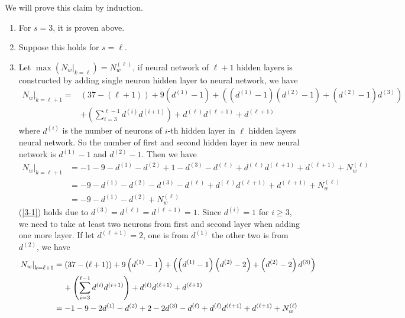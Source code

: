 \documentclass[12pt]{article}
\newcommand{\ParTh}[1]{\left(#1\right)}
\begin{document}
We will prove this claim by induction.
\begin{enumerate}
	\item For $s=3$, it is proven above.
	\item Suppose this holds for $s=\ell$.
	\item Let $\max\ParTh{\left.N_w\right|_{k=\ell}}=N^{\ParTh{\ell}}_w$, if neural network of $\ell+1$ hidden layers is constructed by adding single neuron hidden layer to neural network, we have
	\begin{align}
	\nonumber
	\left.N_w\right|_{k=\ell+1}=&\ParTh{37-\ParTh{\ell+1}}+9\ParTh{d^{\ParTh{1}}-1}+\ParTh{\ParTh{d^{\ParTh{1}}-1}\ParTh{d^{\ParTh{2}}-1}+\ParTh{d^{\ParTh{2}}-1}d^{\ParTh{3}}}\\
	&+\ParTh{\sum_{i=3}^{\ell-1}d^{\ParTh{i}}d^{\ParTh{i+1}}}+d^{\ParTh{\ell}}d^{\ParTh{\ell+1}}+d^{\ParTh{\ell+1}}
	\end{align}
	where $d^{\ParTh{i}}$ is the number of neurons of $i$-th hidden layer in $\ell$ hidden layers neural network. So the number of first and second hidden layer in new neural network is $d^{\ParTh{1}}-1$ and $d^{\ParTh{2}}-1$. Then we have
	\begin{align}
	\left.N_w\right|_{k=\ell+1}&=-1-9-d^{\ParTh{1}}-d^{\ParTh{2}}+1-d^{\ParTh{3}}-d^{\ParTh{\ell}}+d^{\ParTh{\ell}}d^{\ParTh{\ell+1}}+d^{\ParTh{\ell+1}}+N^{\ParTh{\ell}}_w\\
	&=-9-d^{\ParTh{1}}-d^{\ParTh{2}}-d^{\ParTh{3}}-d^{\ParTh{\ell}}+d^{\ParTh{\ell}}d^{\ParTh{\ell+1}}+d^{\ParTh{\ell+1}}+N^{\ParTh{\ell}}_w\\
	\label{3-1}
	&=-9-d^{\ParTh{1}}-d^{\ParTh{2}}+N^{\ParTh{\ell}}_w
	\end{align}
	(\ref{3-1}) holds due to $d^{\ParTh{3}}=d^{\ParTh{\ell}}=d^{\ParTh{\ell+1}}=1$. Since $d^{\ParTh{i}}=1$ for $i\geq3$, we need to take at least two neurons from first and second layer when adding one more layer. If let $d^{\ParTh{\ell+1}}=2$, one is from $d^{\ParTh{1}}$ the other two is from $d^{\ParTh{2}}$, we have
	\begin{align}
	\nonumber
	\left.N_w\right|_{k=\ell+1}&=\ParTh{37-\ParTh{\ell+1}}+9\ParTh{d^{\ParTh{1}}-1}+\ParTh{\ParTh{d^{\ParTh{1}}-1}\ParTh{d^{\ParTh{2}}-2}+\ParTh{d^{\ParTh{2}}-2}d^{\ParTh{3}}}\\
	&\hspace{4mm}+\ParTh{\sum_{i=3}^{\ell-1}d^{\ParTh{i}}d^{\ParTh{i+1}}}+d^{\ParTh{\ell}}d^{\ParTh{\ell+1}}+d^{\ParTh{\ell+1}}\\
	&=-1-9-2d^{\ParTh{1}}-d^{\ParTh{2}}+2-2d^{\ParTh{3}}-d^{\ParTh{\ell}}+d^{\ParTh{\ell}}d^{\ParTh{\ell+1}}+d^{\ParTh{\ell+1}}+N^{\ParTh{\ell}}_w\\

\end{align}
\end{enumerate}
\end{document}
